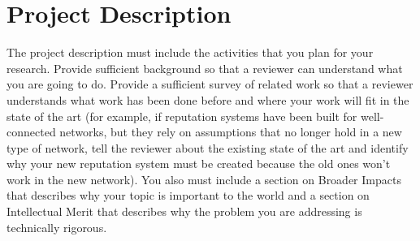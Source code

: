 \documentclass[10pt,conference]{IEEEtran}
\begin{document}
\section{Project Description}

The project description must include the activities that you plan for your 
research.  Provide sufficient background so that a reviewer can understand 
what you are going to do.  Provide a sufficient survey of related work so that 
a reviewer understands what work has been done before and where your work will 
fit in the state of the art (for example, if reputation systems have been 
built for well-connected networks, but they rely on assumptions that no longer 
hold in a new type of network, tell the reviewer about the existing state of 
the art and identify why your new reputation system must be created because 
the old ones won't work in the new network). You also must include a section 
on Broader Impacts that describes why your topic is important to the world and 
a section on Intellectual Merit that describes why the problem you are 
addressing is technically rigorous.




\end{document}
